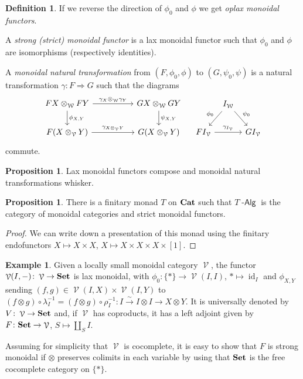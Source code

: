 \documentclass[a4paper,11pt,oneside,openany]{scrbook}
\newcommand{\catname}[1]{{\normalfont\textbf{#1}}}
\DeclareMathOperator{\Alg}{-\mathsf{Alg}}
\newcommand{\Set}{\catname{Set}}
\newcommand{\Cat}{\catname{Cat}}
\DeclareMathOperator{\V}{\mathcal{V}}
\DeclareMathOperator{\W}{\mathcal{W}}
\DeclareMathOperator{\id}{id}
\theoremstyle{definition}
\theoremstyle{definition}
\newtheorem{defn}[thm]{Definition} %
\newtheorem{prop}[thm]{Proposition}
\newtheorem{exmp}[thm]{Example}
\begin{document}
\begin{defn}
    If we reverse the direction of $\phi_0$ and $\phi$ we get \emph{oplax monoidal functors}.
    
    A \emph{strong (strict) monoidal functor} is a lax monoidal functor such that $\phi_0$ and $\phi$ are isomorphisms (respectively identities).
    
    A \emph{monoidal natural transformation} from $(F,\phi_0,\phi)$ to $(G,\psi_0,\psi)$ is a natural transformation $\gamma\colon F\Rightarrow G$ such that the diagrams
    \[
    \begin{tikzcd}[column sep=5.0em]
        FX\otimes_{\W}FY\ar[r, "\gamma_X\otimes_{\W}\gamma_Y"]\ar[d, "\phi_{X,Y}"]
        & GX\otimes_{\W}GY\ar[d, "\psi_{X,Y}"] \\
        F(X\otimes_{\V}Y)\ar[r, "\gamma_{X\otimes_{\V}Y}"]
        & G(X\otimes_{\V}Y)
    \end{tikzcd}
    \quad
    \begin{tikzcd}[column sep=tiny]
        & I_{\W}\ar[dl, "\phi_0", swap]\ar[dr, "\psi_0"] \\
        FI_{\V}\ar[rr, "\gamma_{I_{\V}}"]
        && GI_{\V}
    \end{tikzcd}
    \]
    commute.
\end{defn}

\begin{prop}
    Lax monoidal functors compose and monoidal natural transformations whisker.
\end{prop}

\begin{prop}
    There is a finitary monad $T$ on $\Cat$ such that $T\Alg$ is the category of monoidal categories and strict monoidal functors.
\end{prop}

\begin{proof}
    We can write down a presentation of this monad using the finitary endofunctors $X\mapsto X\times X$, $X\mapsto X\times X\times X\times [1]$.
\end{proof}

\begin{exmp}
    Given a locally small monoidal category $\V$, the functor $\V(I,-)\colon\V\rightarrow\Set$ is lax monoidal, with $\phi_0\colon\{*\}\rightarrow\V(I,I)$, $*\mapsto\id_{I}$ and $\phi_{X,Y}$ sending $(f,g)\in\V(I,X)\times\V(I,Y)$ to $(f\otimes g)\circ\lambda_I^{-1}=(f\otimes g)\circ\rho_I^{-1}\colon I\xrightarrow{\sim} I\otimes I\rightarrow X\otimes Y$. It is universally denoted by $V\colon\V\rightarrow\Set$ and, if $\V$ has coproducts, it has a left adjoint given by $F\colon\Set\rightarrow\V$, $S\mapsto\amalg_S I$.
    
    Assuming for simplicity that $\V$ is cocomplete, it is easy to show that $F$ is strong monoidal if $\otimes$ preserves colimits in each variable by using that $\Set$ is the free cocomplete category on $\{*\}$.
\end{exmp}
\end{document}
